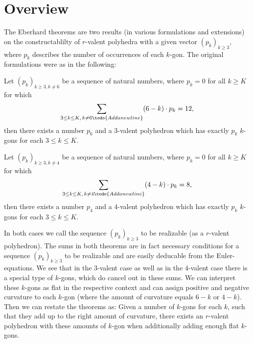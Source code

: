 \section{Overview}

The {\sc Eberhard} theorems are two results (in various formulations and extensions) on the constructablilty of $r$-valent polyhedra with a given vector $(p_k)_{k \geq 3}$, where $p_k$ describes the number of occurrences of each $k$-gon. The original formulations were as in the following:
\begin{theorem} Let $(p_k)_{k \geq 3, k \neq 6}$ be a sequence of natural numbers, where $p_k = 0$ for all $k \geq K$ for which
\begin{align*}
  \sum_{3 \leq k \leq K,\, k \neq 6 \todo{Add a new line}}(6 - k) \cdot p_k = 12,
\end{align*}
then there exists a number $p_6$ and a $3$-valent polyhedron which has exactly $p_k$ $k$-gons for each $3 \leq k \leq K$.
\end{theorem}
\begin{theorem} Let $(p_k)_{k \geq 3, k \neq 4}$ be a sequence of natural numbers, where $p_k = 0$ for all $k \geq K$ for which
\begin{align*}
  \sum_{3 \leq k \leq K,\, k \neq 4 \todo{Add a new line}}(4 - k) \cdot p_k = 8,
\end{align*}
then there exists a number $p_4$ and a $4$-valent polyhedron which has exactly $p_k$ $k$-gons for each $3 \leq k \leq K$.
\end{theorem}

In both cases we call the sequence $(p_k)_{k \geq 3}$ to be realizable (as a $r$-valent polyhedron). The sums in both theorems are in fact necessary conditions for a sequence $(p_k)_{k \geq 3}$ to be realizable and are easily deducable from the {\sc Euler}-equations. We see that in the $3$-valent case as well as in the $4$-valent case there is a special type of $k$-gons, which do cancel out in these sums. We can interpret these $k$-gons as flat in the respective context and can assign positive and negative curvature to each $k$-gon (where the amount of curvature equals $6 - k$ or $4 - k$). Then we can restate the theorems as: Given a number of $k$-gons for each $k$, such that they add up to the right amount of curvature, there exists an $r$-valent polyhedron with these amounts of $k$-gon when additionally adding enough flat $k$-gons.

